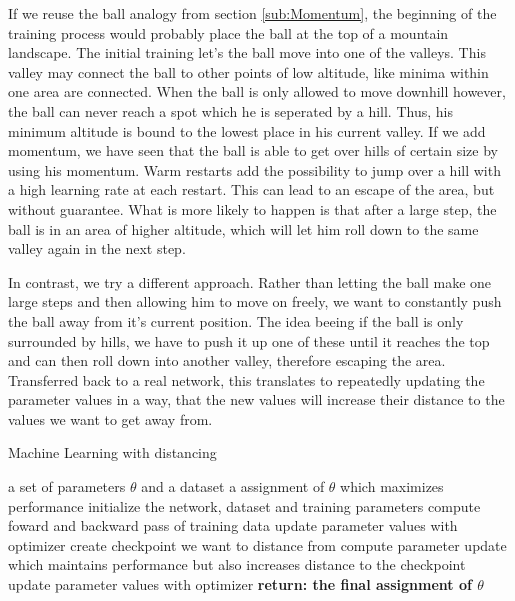 If we reuse the ball analogy from section \ref{sub:Momentum}, the beginning of
the training process would probably place the ball at the top of a mountain
landscape. The initial training let's the ball move into one of the valleys.
This valley may connect the ball to other points of low altitude, like minima
within one area are connected. When the ball is only allowed to move downhill
however, the ball can never reach a spot which he is seperated by a hill. Thus,
his minimum altitude is bound to the lowest place in his current valley. If we
add momentum, we have seen that the ball is able to get over hills of certain
size by using his momentum. Warm restarts add the possibility to jump over a
hill with a high learning rate at each restart. This can lead to an escape of
the area, but without guarantee. What is more likely to happen is that after a
large step, the ball is in an area of higher altitude, which will let him roll
down to the same valley again in the next step.

In contrast, we try a different approach. Rather than letting the ball make one
large steps and then allowing him to move on freely, we want to constantly push
the ball away from it's current position. The idea beeing if the ball is only
surrounded by hills, we have to push it up one of these until it reaches the top
and can then roll down into another valley, therefore escaping the area.
Transferred back to a real network, this translates to repeatedly updating the
parameter values in a way, that the new values will increase their distance to
the values we want to get away from.


\begin{algorithm}
    \begin{algorithmic}[1]
        \caption{Machine Learning with distancing}
        \REQUIRE a set of parameters $\theta$ and a dataset
        \ENSURE a assignment of $\theta$ which maximizes performance
        \STATE initialize the network, dataset and training parameters
            \STATE compute foward and backward pass of training data
            \STATE update parameter values with optimizer
        \ENDFOR
        \STATE create checkpoint we want to distance from
			\STATE compute parameter update which maintains performance but also increases distance to the checkpoint
			\ENDFOR
		\STATE update parameter values with optimizer
        \ENDFOR
        \STATE \textbf{return: the final assignment of $\theta$}
    \end{algorithmic}
    \label{alg:Distance_Motivation}
\end{algorithm}

